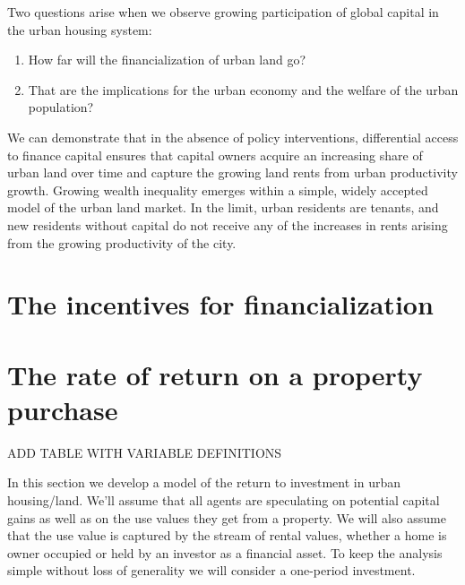 Two questions arise when we observe growing participation of global capital in the urban housing system: 
\begin{enumerate}
\item How far will the financialization of urban land go? 
\item That are the implications for the urban economy and the welfare of the urban population? 
\end{enumerate}

We can demonstrate  that  in the absence of policy interventions, differential access to finance capital ensures that capital owners acquire an increasing share of urban land over time and capture the growing  land rents  from urban productivity growth. Growing wealth inequality emerges within a simple, widely accepted model of the urban land market. In the limit,  urban residents are tenants, and new residents  without capital do  not receive any of the increases in rents arising from the growing productivity of the city. 





\section{The incentives for financialization}%

  





\section{The rate of return on a property purchase}


ADD TABLE WITH VARIABLE DEFINITIONS
 
 In this section we develop a model of the return to investment in urban housing/land. We'll assume that all agents are speculating on potential capital gains as well as on the use values they get from a property.  We will also assume that the use value is captured by the stream of rental values, whether a home is owner occupied or  held by an investor as a financial asset. To keep the analysis simple without loss of generality we will consider a one-period investment.
 
